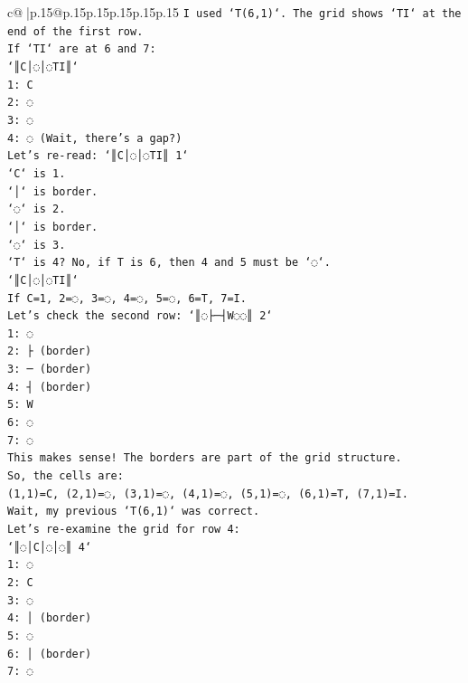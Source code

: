 \documentclass{article}
\begin{document}
{\begin{supertabular}{c@{$\;$}|p{.15\linewidth}@{}p{.15\linewidth}p{.15\linewidth}p{.15\linewidth}p{.15\linewidth}p{.15\linewidth}}
{{{\texttt{I used `T(6,1)`. The grid shows `TI` at the end of the first row.} \\
\texttt{If `TI` are at 6 and 7:} \\
\texttt{`║C│◌│◌TI║`} \\
\texttt{1: C} \\
\texttt{2: ◌} \\
\texttt{3: ◌} \\
\texttt{4: ◌ (Wait, there's a gap?)} \\
\texttt{Let's re{-}read: `║C│◌│◌TI║ 1`} \\
\texttt{`C` is 1.} \\
\texttt{`│` is border.} \\
\texttt{`◌` is 2.} \\
\texttt{`│` is border.} \\
\texttt{`◌` is 3.} \\
\texttt{`T` is 4? No, if T is 6, then 4 and 5 must be `◌`.} \\
\texttt{`║C│◌│◌TI║`} \\
\texttt{If C=1, 2=◌, 3=◌, 4=◌, 5=◌, 6=T, 7=I.} \\
\texttt{Let's check the second row: `║◌├─┤W◌◌║ 2`} \\
\texttt{1: ◌} \\
\texttt{2: ├ (border)} \\
\texttt{3: ─ (border)} \\
\texttt{4: ┤ (border)} \\
\texttt{5: W} \\
\texttt{6: ◌} \\
\texttt{7: ◌} \\
\texttt{This makes sense! The borders are part of the grid structure.} \\
\texttt{So, the cells are:} \\
\texttt{(1,1)=C, (2,1)=◌, (3,1)=◌, (4,1)=◌, (5,1)=◌, (6,1)=T, (7,1)=I.} \\
\texttt{Wait, my previous `T(6,1)` was correct.} \\
\texttt{Let's re{-}examine the grid for row 4:} \\
\texttt{`║◌│C│◌│◌║ 4`} \\
\texttt{1: ◌} \\
\texttt{2: C} \\
\texttt{3: ◌} \\
\texttt{4: │ (border)} \\
\texttt{5: ◌} \\
\texttt{6: │ (border)} \\
\texttt{7: ◌} \\
}}}
\end{supertabular}}
\end{document}
